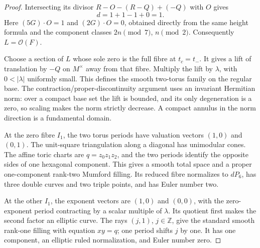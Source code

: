 \begin{proof}
Intersecting its divisor \(R-O-(R-Q)+(-Q)\) with \(O\) gives \[
 d=1+1-1+0=1.
\] Here \((5G)\cdot O=1\) and \((2G)\cdot O=0\), obtained directly from the same height formula and the component classes \(2n\pmod7\), \(n\pmod2\). Consequently \(L=\mathcal O(F)\).

Choose a section of \(L\) whose sole zero is the full fibre at \(t_c=t_-\). It gives a lift of translation by \(-Q\) on \(M^\times\) away from that fibre. Multiply the lift by \(\lambda\), with \(0<|\lambda|\) uniformly small. This defines the smooth two-torus family on the regular base. The contraction/proper-discontinuity argument uses an invariant Hermitian norm: over a compact base set the lift is bounded, and its only degeneration is a zero, so scaling makes the norm strictly decrease. A compact annulus in the norm direction is a fundamental domain.

At the zero fibre \(I_1\), the two torus periods have valuation vectors \((1,0)\) and \((0,1)\). The unit-square triangulation along a diagonal has unimodular cones. The affine toric charts are \(q=z_0z_1z_2\), and the two periods identify the opposite sides of one hexagonal component. This gives a smooth total space and a proper one-component rank-two Mumford filling. Its reduced fibre normalizes to \(dP_6\), has three double curves and two triple points, and has Euler number two.

At the other \(I_1\), the exponent vectors are \((1,0)\) and \((0,0)\), with the zero-exponent period contracting by a scalar multiple of \(\lambda\). Its quotient first makes the second factor an elliptic curve. The rays \((j,1)\), \(j\in\mathbb Z\), give the standard smooth rank-one filling with equation \(xy=q\); one period shifts \(j\) by one. It has one component, an elliptic ruled normalization, and Euler number zero.


\end{proof}
